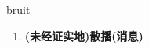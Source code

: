 
\begin{frame}
{\huge bruit}
\begin{center}
\begin{enumerate}\Large
  \item \textbf{(未经证实地)散播(消息)}
\end{enumerate}
\end{center}
\end{frame}

